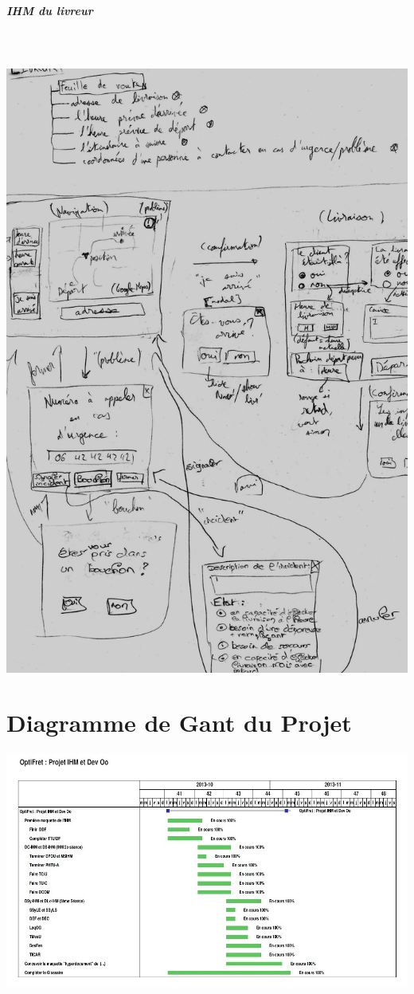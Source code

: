 \documentclass{report}
\begin{document}
\begin{appendices}
\paragraph{IHM du livreur}
~~\\
~~\\
\includegraphics[scale = 0.16]{images/croquislivreur.jpg}



\chapter{Diagramme de Gant du Projet}

\includegraphics[scale = 0.6]{images/gant.jpg}

\end{appendices}
\end{document}
